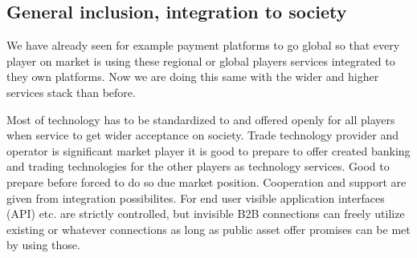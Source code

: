 \subsection{General inclusion, integration to society}\label{inclusion}
We have already seen for example payment platforms to go global so that every
player on market is using these regional or global players services integrated
to they own platforms. Now we are doing this same with the wider and higher
services stack than before.

Most of technology has to be standardized to and offered openly for all
players when service to get wider acceptance on society. Trade technology
provider and operator is significant market player it is good to prepare to
offer created banking and trading technologies for the other players as
technology services. Good to prepare before forced to do so due market
position. Cooperation and support are given from integration possibilites.
For end user visible application interfaces (API) etc. are strictly
controlled, but invisible B2B connections can freely utilize existing or
whatever connections as long as public asset offer promises can be met by
using those.

